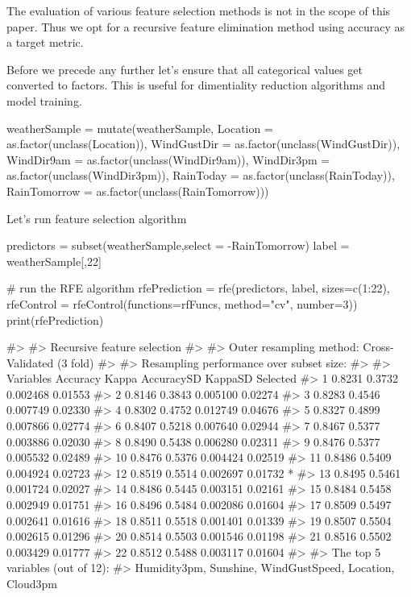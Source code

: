 The evaluation of various feature selection methods is not in the scope
of this paper. Thus we opt for a recursive feature elimination method
using accuracy as a target metric.

Before we precede any further let's ensure that all categorical values
get converted to factors. This is useful for dimentiality reduction
algorithms and model training.

\begin{Schunk}
\begin{Sinput}
weatherSample = mutate(weatherSample, Location = as.factor(unclass(Location)), 
          WindGustDir = as.factor(unclass(WindGustDir)),
          WindDir9am = as.factor(unclass(WindDir9am)), WindDir3pm = as.factor(unclass(WindDir3pm)),
          RainToday = as.factor(unclass(RainToday)), RainTomorrow = as.factor(unclass(RainTomorrow)))
\end{Sinput}
\end{Schunk}

Let's run feature selection algorithm

\begin{Schunk}
\begin{Sinput}
predictors = subset(weatherSample,select = -RainTomorrow)
label = weatherSample[,22]

# run the RFE algorithm
rfePrediction = rfe(predictors, label, sizes=c(1:22), 
                    rfeControl = rfeControl(functions=rfFuncs, method="cv", number=3))
print(rfePrediction)
\end{Sinput}
\begin{Soutput}
#> 
#> Recursive feature selection
#> 
#> Outer resampling method: Cross-Validated (3 fold) 
#> 
#> Resampling performance over subset size:
#> 
#>  Variables Accuracy  Kappa AccuracySD KappaSD Selected
#>          1   0.8231 0.3732   0.002468 0.01553         
#>          2   0.8146 0.3843   0.005100 0.02274         
#>          3   0.8283 0.4546   0.007749 0.02330         
#>          4   0.8302 0.4752   0.012749 0.04676         
#>          5   0.8327 0.4899   0.007866 0.02774         
#>          6   0.8407 0.5218   0.007640 0.02944         
#>          7   0.8467 0.5377   0.003886 0.02030         
#>          8   0.8490 0.5438   0.006280 0.02311         
#>          9   0.8476 0.5377   0.005532 0.02489         
#>         10   0.8476 0.5376   0.004424 0.02519         
#>         11   0.8486 0.5409   0.004924 0.02723         
#>         12   0.8519 0.5514   0.002697 0.01732        *
#>         13   0.8495 0.5461   0.001724 0.02027         
#>         14   0.8486 0.5445   0.003151 0.02161         
#>         15   0.8484 0.5458   0.002949 0.01751         
#>         16   0.8496 0.5484   0.002086 0.01604         
#>         17   0.8509 0.5497   0.002641 0.01616         
#>         18   0.8511 0.5518   0.001401 0.01339         
#>         19   0.8507 0.5504   0.002615 0.01296         
#>         20   0.8514 0.5503   0.001546 0.01198         
#>         21   0.8516 0.5502   0.003429 0.01777         
#>         22   0.8512 0.5488   0.003117 0.01604         
#> 
#> The top 5 variables (out of 12):
#>    Humidity3pm, Sunshine, WindGustSpeed, Location, Cloud3pm
\end{Soutput}
\end{Schunk}

